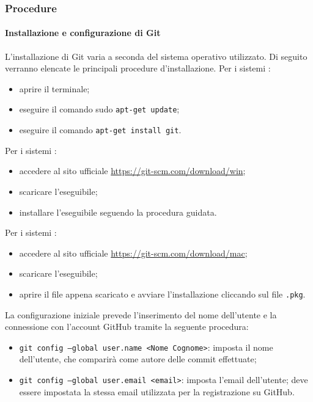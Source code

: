 	  \subsubsection{Procedure}
	  \paragraph{Installazione e configurazione di Git}
	  L'installazione di Git varia a seconda del sistema operativo utilizzato. Di seguito verranno elencate le principali procedure d'installazione.
	  \newline \newline
	  Per i sistemi :
	  \begin{itemize}
	  	\item aprire il terminale;
	  	\item eseguire il comando sudo \texttt{apt-get update};
	  	\item eseguire il comando \texttt{apt-get install git}.
	  \end{itemize}
	  Per i sistemi :
	  \begin{itemize}
	  	\item accedere al sito ufficiale \url{https://git-scm.com/download/win};
	  	\item scaricare l'eseguibile;
	  	\item installare l'eseguibile seguendo la procedura guidata.
	  \end{itemize}
	  Per i sistemi :
	  \begin{itemize}
	  	\item accedere al sito ufficiale \url{https://git-scm.com/download/mac};
	  	\item scaricare l'eseguibile;
	  	\item aprire il file appena scaricato e avviare l'installazione cliccando sul file \texttt{.pkg}.
	  \end{itemize}
	  La configurazione iniziale prevede l'inserimento del nome dell'utente e la connessione con l'account GitHub tramite la seguente procedura:
	  \begin{itemize}
	  	\item \texttt{{git} config --global user.name <Nome Cognome>}: imposta il nome dell'utente, che comparirà come autore delle commit effettuate;
	  	\item \texttt{{git} config --global user.email <email>}: imposta l'email dell'utente; deve essere impostata la stessa email utilizzata per la registrazione su GitHub.
	  \end{itemize}
